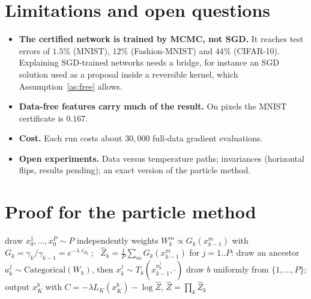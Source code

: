 \documentclass[11pt]{article}
\theoremstyle{definition}
\theoremstyle{remark}
\begin{document}
\section{Limitations and open questions}
\begin{itemize}[nosep]
\item \textbf{The certified network is trained by MCMC, not SGD.} It reaches test errors of $1.5\%$ (MNIST), $12\%$
  (Fashion-MNIST) and $44\%$ (CIFAR-10). Explaining SGD-trained networks needs a bridge, for instance an SGD solution used
  as a proposal inside a reversible kernel, which Assumption~\ref{as:free} allows.
\item \textbf{Data-free features carry much of the result.} On pixels the MNIST certificate is $0.167$.
\item \textbf{Cost.} Each run costs about $30{,}000$ full-data gradient evaluations.
\item \textbf{Open experiments.} Data versus temperature paths; invariances (horizontal flips, results pending); an exact
  version of the particle method.
\end{itemize}

\appendix
\section{Proof for the particle method}\label{app:smc}
\begin{algorithm}[h]
\caption{Particle version (\texttt{--P} $>1$)}\label{alg:smc}
\begin{algorithmic}[1]
\State draw $x_0^1,\dots,x_0^P\sim P$ independently
  \State weights $W_k^m\propto G_k(x_{k-1}^m)$ with $G_k=\gamma_k/\gamma_{k-1}=e^{-\lambda\ell_{B_k}}$; \ $\hat Z_k=\frac1P\sum_mG_k(x_{k-1}^m)$
  \State for $j=1..P$: draw an ancestor $a_k^j\sim\mathrm{Categorical}(W_k)$, then $x_k^j\sim T_k(x_{k-1}^{a_k^j},\cdot)$
\EndFor
\State draw $b$ uniformly from $\{1,\dots,P\}$; output $x_K^b$ with $C=-\lambda L_K(x_K^b)-\log\hat Z$, $\hat Z=\prod_k\hat Z_k$
\end{algorithmic}
\end{algorithm}
\end{document}
